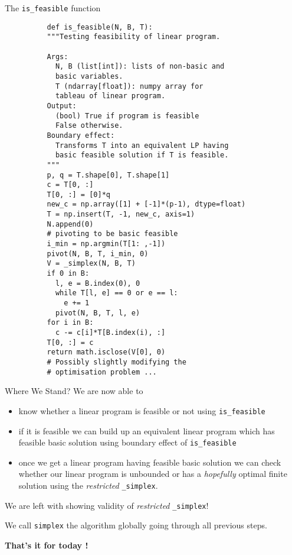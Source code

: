 \documentclass[32pt, aspectratio = 169]{beamer}
\begin{document}
\begin{frame}[fragile]{The \texttt{is_feasible} function}
  \begin{overlayarea}{1.05\textwidth}{.75\textheight}
    \setlength\columnseprule{.1pt}
    \begin{multicols}{2}
      \scriptsize{
        \begin{verbatim}
          def is_feasible(N, B, T):
          """Testing feasibility of linear program.

          Args:
            N, B (list[int]): lists of non-basic and
            basic variables.
            T (ndarray[float]): numpy array for
            tableau of linear program.
          Output:
            (bool) True if program is feasible
            False otherwise.
          Boundary effect:
            Transforms T into an equivalent LP having
            basic feasible solution if T is feasible.
          """
          p, q = T.shape[0], T.shape[1]
          c = T[0, :]
          T[0, :] = [0]*q
          new_c = np.array([1] + [-1]*(p-1), dtype=float)
          T = np.insert(T, -1, new_c, axis=1)
          N.append(0)
          # pivoting to be basic feasible
          i_min = np.argmin(T[1: ,-1])
          pivot(N, B, T, i_min, 0)
          V = _simplex(N, B, T)
          if 0 in B:
            l, e = B.index(0), 0
            while T[l, e] == 0 or e == l:
              e += 1
            pivot(N, B, T, l, e)
          for i in B:
            c -= c[i]*T[B.index(i), :]
          T[0, :] = c
          return math.isclose(V[0], 0)
          # Possibly slightly modifying the
          # optimisation problem ...
      \end{verbatim}
    }
  \end{multicols}
\end{overlayarea}
\end{frame}

\begin{frame}{Where We Stand?}
  We are now able to
  \begin{itemize}
  \item<1->
    know whether a linear program is feasible or not using
    \texttt{is_feasible}
  \item<2->
    if it is feasible we can build up an equivalent linear program
    which has feasible basic solution using boundary effect of
    \texttt{is_feasible}
  \item<3->
    once we get a linear program having feasible basic solution we can
    check whether our linear program is unbounded or has a
    \textit{hopefully} optimal finite solution using the
    \textit{restricted} \texttt{_simplex}.
  \end{itemize}
  \pause[4]
  We are left with showing validity of \textit{restricted}
  \texttt{_simplex}!
  \begin{tcolorbox}[
    enhanced,
    parbox = false,
    colback = mLightBrown!30!white,
    colframe = mLightBrown!30!white,
    arc = 0mm,
    ]
    We call \texttt{simplex} the algorithm globally going
    through all previous steps.
  \end{tcolorbox}
\end{frame}

\begin{frame}
  \centering
  {\huge \textbf{That's it for today !}}
\end{frame}
\end{document}
